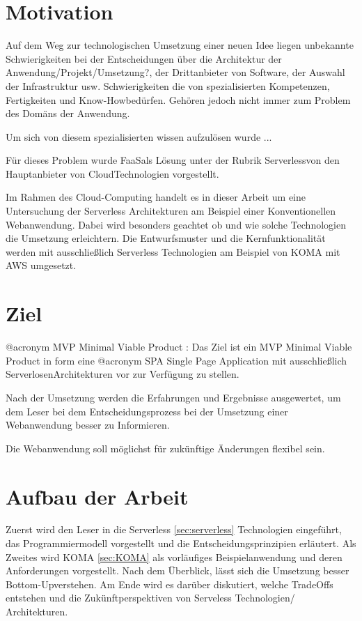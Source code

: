 \documentclass[
12pt,
english,
ngerman,
headsepline,
twoside,
openright,
numbers=noenddot,version=first
]{scrreprt}
\begin{document}
\section{Motivation}


Auf dem Weg zur technologischen Umsetzung einer neuen Idee liegen unbekannte Schwierigkeiten
bei der Entscheidungen über die Architektur der Anwendung/Projekt/Umsetzung?,
der Drittanbieter von Software, der Auswahl der Infrastruktur usw.
Schwierigkeiten die von spezialisierten Kompetenzen, Fertigkeiten und \glqq Know-How\grqq bedürfen.
Gehören jedoch nicht immer zum Problem des Domäns der Anwendung.

Um sich von diesem spezialisierten wissen aufzulösen wurde ...

Für dieses Problem wurde \glqq FaaS\grqq als Lösung unter der Rubrik \glqq Serverless\grqq von den Hauptanbieter von \glqq Cloud\grqq Technologien vorgestellt.

Im Rahmen des Cloud-Computing handelt es in dieser Arbeit um eine Untersuchung der Serverless Architekturen am Beispiel einer Konventionellen Webanwendung. Dabei wird besonders geachtet ob und wie solche Technologien die Umsetzung erleichtern. Die Entwurfsmuster und die Kernfunktionalität werden mit ausschließlich Serverless Technologien am Beispiel von KOMA mit AWS umgesetzt.


\section{Ziel}
\label{sec:task}

@acronym MVP Minimal Viable Product : \cite{rady2016serverless} Das Ziel ist ein MVP Minimal Viable Product in form eine @acronym SPA Single Page Application mit ausschließlich \glqq Serverlosen\grqq Architekturen vor zur Verfügung zu stellen.

Nach der Umsetzung werden die Erfahrungen und Ergebnisse ausgewertet, um dem Leser bei dem Entscheidungsprozess bei der Umsetzung einer Webanwendung besser zu Informieren. 

Die Webanwendung soll möglichst für zukünftige Änderungen flexibel sein. 

\section{Aufbau der Arbeit}
\label{sec:layout}

Zuerst wird den Leser in die Serverless \ref{sec:serverless} Technologien eingeführt, das Programmiermodell vorgestellt
und die Entscheidungsprinzipien erläutert.
Als Zweites wird KOMA \ref{sec:KOMA} als vorläufiges Beispielanwendung und deren Anforderungen vorgestellt.
Nach dem Überblick, lässt sich die Umsetzung besser \glqq Bottom-Up\grqq verstehen. 
Am Ende wird es darüber diskutiert, welche TradeOffs entstehen und die Zukünftperspektiven von Serveless Technologien/ Architekturen.
\end{document}
